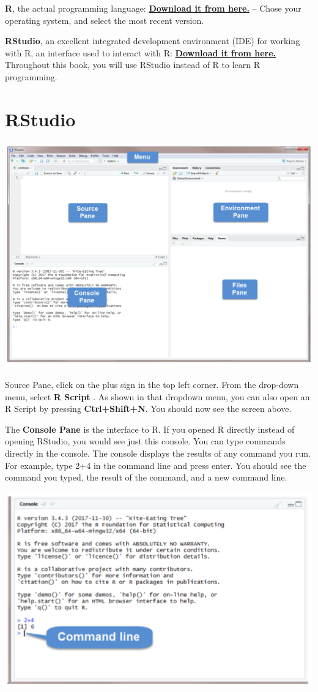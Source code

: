 \documentclass[
]{book}
\begin{document}
\textbf{R}, the actual programming language: \href{https://cran.r-project.org}{\textbf{Download it from here.}} -- Chose your operating system, and select the most recent version.

\textbf{RStudio}, an excellent integrated development environment (IDE) for working with R, an interface used to interact with R: \href{https://www.rstudio.com}{\textbf{Download it from here.}} Throughout this book, you will use RStudio instead of R to learn R programming.

\hypertarget{rstudio}{%
\section{RStudio}\label{rstudio}}

\includegraphics[width=15.15in]{png/Rstudio}

Source Pane, click on the plus sign in the top left corner. From the drop-down menu, select \textbf{R Script} . As shown in that dropdown menu, you can also open an R Script by pressing \textbf{Ctrl+Shift+N}. You should now see the screen above.

The \textbf{Console Pane} is the interface to R. If you opened R directly instead of opening RStudio, you would see just this console. You can type commands directly in the console. The console displays the results of any command you run. For example, type 2+4 in the command line and press enter. You should see the command you typed, the result of the command, and a new command line.

\includegraphics[width=8.24in]{png/Rstudio2}
\end{document}
